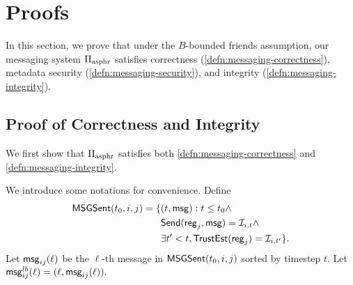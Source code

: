 \section{Proofs}
\label{sec:proofs}
In this section, we prove that under the $B$-bounded friends assumption, our messaging system $\Pi_{\text{asphr}}$ satisfies correctness (\cref{defn:messaging-correctness}), metadata security (\cref{defn:messaging-security}), and integrity (\cref{defn:messaging-integrity}).
\subsection{Proof of Correctness and Integrity}
We first show that $\Pi_{\text{asphr}}$ satisfies both \cref{defn:messaging-correctness} and \cref{defn:messaging-integrity}.

We introduce some notations for convenience. Define
\begin{align*}
    \mathsf{MSGSent}(t_0, i, j) = \{&(t, \mathsf{msg}): t \leq t_0 \land \\
    &\mathsf{Send}(\mathsf{reg}_j, \mathsf{msg}) = \mathcal{I}_{i, t} \land \\
             &\exists t' < t, \mathsf{TrustEst}(\mathsf{reg}_j) = \mathcal{I}_{i, t'}\}.
\end{align*}
Let $\mathsf{msg}_{ij}(\ell)$ be the $\ell$-th message in $\mathsf{MSGSent}(t_0, i, j)$ sorted by timestep $t$. Let $\mathsf{msg}_{ij}^{lb}(\ell) = (\ell, \mathsf{msg}_{ij}(\ell)).$

